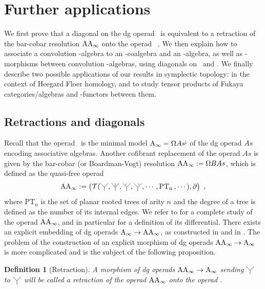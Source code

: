 \documentclass[twoside, 11pt]{amsart}
\newtheorem{definition}{Definition}[section]
\theoremstyle{remark}
\begin{document}

\section{Further applications} \label{sec:V}

We first prove that a diagonal on the dg operad \Ainf\ is equivalent to a retraction of the bar-cobar resolution $\mathrm{AA}_\infty$ onto the operad \Ainf\ . 
We then explain how to associate a convolution \Ainf -algebra to an \Ainf -coalgebra and an \Ainf -algebra, as well as \Ainf -morphisms between convolution \Ainf -algebras, using diagonals on \Ainf\ and \Minf .
We finally describe two possible applications of our results in symplectic topology: in the context of Heegard Floer homology, and to study tensor products of Fukaya categories/algebras and \Ainf -functors between them.

\subsection{Retractions and diagonals} \label{ss:retract-diag}

Recall that the operad \Ainf\ is the minimal model $\mathrm{A}_\infty =\Omega As^{\text{!`}}$ of the dg operad $As$ encoding associative algebras. 
Another cofibrant replacement of the operad $As$ is given by the bar-cobar (or Boardman-Vogt) resolution $\mathrm{AA}_\infty := \Omega B As$, which is defined as the quasi-free operad 
\[ \AAinf := \left( \mathcal{T} (\premiertermecobarbarA , \premiertermecobarbarD , \premiertermecobarbarB , \premiertermecobarbarC , \cdots , \mathrm{PT_n} \text{\hspace{2pt}}, \cdots ) , \partial \right) \ , \] 
where $\mathrm{PT_n}$ is the set of planar rooted trees of arity $n$ and the degree of a tree is defined as the number of its internal edges.
We refer to \cite[Section 9.3]{LodayVallette12} for a complete study of the operad $\mathrm{AA}_\infty$, and in particular for a definition of its differential.
There exists an explicit embedding of dg operads $\mathrm{A}_\infty \rightarrow \mathrm{AA}_\infty$, as constructed in \cite[Section 4]{MarklShnider06} and in \cite[Section 1.3.1.5]{mazuir-I}.
The problem of the construction of an explicit morphism of dg operads $\mathrm{AA}_\infty \rightarrow \mathrm{A}_\infty$ is more complicated and is the subject of the following proposition. 

\begin{definition}[Retraction]
A morphism of dg operads $\mathrm{AA}_\infty \rightarrow \mathrm{A}_\infty$ sending $\premiertermecobarbarA$ to $\premiertermecobarbarA$ will be called a \emph{retraction of the operad $\mathrm{AA}_\infty$ onto the operad \Ainf }.
\end{definition}
\end{document}
